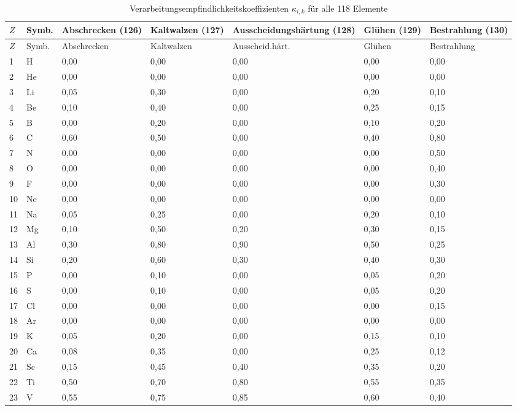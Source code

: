 \documentclass[12pt,a4paper]{article}
\begin{document}
\begin{longtable}{p{2.2cm}p{1.2cm}p{2.2cm}p{2.2cm}p{2.2cm}p{2.2cm}p{2.2cm}}
	\caption{Verarbeitungsempfindlichkeitskoeffizienten \(\kappa_{i,k}\) für alle 118 Elemente} \label{tab:kappa-ik-full} \\
	\toprule
	\(Z\) & Symb. & Abschrecken (126) & Kaltwalzen (127) & Ausscheidungshärtung (128) & Glühen (129) & Bestrahlung (130) \\
	\midrule
	\endfirsthead
	\toprule
	\(Z\) & Symb. & Abschrecken & Kaltwalzen & Ausscheid.härt. & Glühen & Bestrahlung \\
	\midrule
	\endhead
	1  & H   & 0,00 & 0,00 & 0,00 & 0,00 & 0,00 \\
	2  & He  & 0,00 & 0,00 & 0,00 & 0,00 & 0,00 \\
	3  & Li  & 0,05 & 0,30 & 0,00 & 0,20 & 0,10 \\
	4  & Be  & 0,10 & 0,40 & 0,00 & 0,25 & 0,15 \\
	5  & B   & 0,00 & 0,20 & 0,00 & 0,10 & 0,20 \\
	6  & C   & 0,60 & 0,50 & 0,00 & 0,40 & 0,80 \\
	7  & N   & 0,00 & 0,00 & 0,00 & 0,00 & 0,50 \\
	8  & O   & 0,00 & 0,00 & 0,00 & 0,00 & 0,40 \\
	9  & F   & 0,00 & 0,00 & 0,00 & 0,00 & 0,30 \\
	10 & Ne  & 0,00 & 0,00 & 0,00 & 0,00 & 0,00 \\
	11 & Na  & 0,05 & 0,25 & 0,00 & 0,20 & 0,10 \\
	12 & Mg  & 0,10 & 0,50 & 0,20 & 0,30 & 0,15 \\
	13 & Al  & 0,30 & 0,80 & 0,90 & 0,50 & 0,25 \\
	14 & Si  & 0,20 & 0,60 & 0,30 & 0,40 & 0,30 \\
	15 & P   & 0,00 & 0,10 & 0,00 & 0,05 & 0,20 \\
	16 & S   & 0,00 & 0,10 & 0,00 & 0,05 & 0,20 \\
	17 & Cl  & 0,00 & 0,00 & 0,00 & 0,00 & 0,15 \\
	18 & Ar  & 0,00 & 0,00 & 0,00 & 0,00 & 0,00 \\
	19 & K   & 0,05 & 0,20 & 0,00 & 0,15 & 0,10 \\
	20 & Ca  & 0,08 & 0,35 & 0,00 & 0,25 & 0,12 \\
	21 & Sc  & 0,15 & 0,45 & 0,40 & 0,35 & 0,20 \\
	22 & Ti  & 0,50 & 0,70 & 0,80 & 0,55 & 0,35 \\
	23 & V   & 0,55 & 0,75 & 0,85 & 0,60 & 0,40 \\

\end{longtable}
\end{document}
